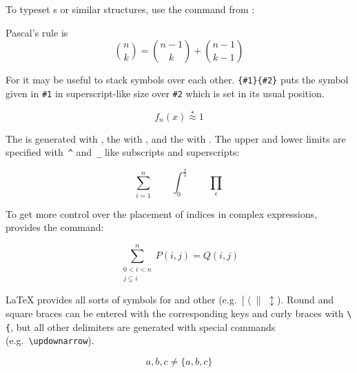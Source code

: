 To typeset s or similar structures, use
the command  from :
\begin{example}
Pascal's rule is
\begin{equation*}
 \binom{n}{k} =\binom{n-1}{k}
 + \binom{n-1}{k-1}
\end{equation*}
\end{example}

For  it may be useful to stack symbols over each other.
\verb|{#1}{#2}| puts the symbol given
in \verb|#1| in superscript-like size over \verb|#2| which
is set in its usual position.
\begin{example}
\begin{equation*}
 f_n(x) \stackrel{*}{\approx} 1
\end{equation*}
\end{example}

The \textbf{} is generated with , the
\textbf{} with , and the \textbf{}
with . The upper and lower limits are specified with~\verb|^|
and~\verb|_| like subscripts and superscripts:
\begin{example}
\begin{equation*}
\sum_{i=1}^n \qquad
\int_0^{\frac{\pi}{2}} \qquad
\prod_\epsilon
\end{equation*}
\end{example}

To get more control over the placement of indices in complex
expressions,  provides the  command:
\begin{example}
\begin{equation*}
\sum^n_{\substack{0<i<n \\ 
        j\subseteq i}}
   P(i,j) = Q(i,j)
\end{equation*}
\end{example}



\LaTeX{} provides all sorts of symbols for \textbf{} and other
\textbf{} (e.g.~$[\;\langle\;\|\;\updownarrow$).
Round and square braces can be entered with the corresponding keys and
curly braces with \verb|\{|, but all other delimiters are generated with
special commands (e.g.~\verb|\updownarrow|).
\begin{example}
\begin{equation*}
{a,b,c} \neq \{a,b,c\}
\end{equation*}
\end{example}

